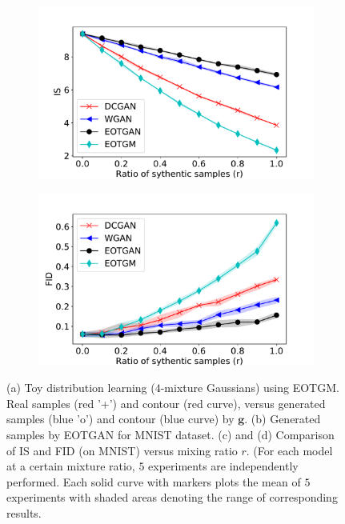 \begin{figure}[!ht]
\begin{subfigure}[b]{0.44\textwidth}
    \caption{}
    \label{fig-fake-wgan}
  \end{subfigure}
  \centering
  \begin{subfigure}[b]{0.44\textwidth}
    \centering
    \includegraphics[width=1.1\linewidth]{images/mnist/tra_score/IS_29.pdf}\vspace{-3pt}
    \caption{}
    \label{fig-tra-is}
  \end{subfigure}
  \begin{subfigure}[b]{0.44\textwidth}
    \centering
    \includegraphics[width=1.1\linewidth]{images/mnist/tra_score/FID_29.pdf}\vspace{-3pt}
    \caption{}
    \label{fig-tra-fid}
  \end{subfigure}
  \caption{(a) Toy distribution learning ($4$-mixture Gaussians) using EOTGM. Real samples (red '+') and contour
    (red curve), versus generated samples (blue 'o') and contour
    (blue curve) by $\bm{g}$. (b) Generated samples by EOTGAN for MNIST dataset. (c) and (d)
    Comparison of IS and FID (on MNIST) versus mixing ratio $r$. (For
    each model at a certain mixture ratio, $5$ experiments are
    independently performed. Each solid curve with markers plots the mean of $5$
    experiments with shaded areas denoting the range of corresponding
    results.}
  \label{fig-tra-score}
\end{figure}

